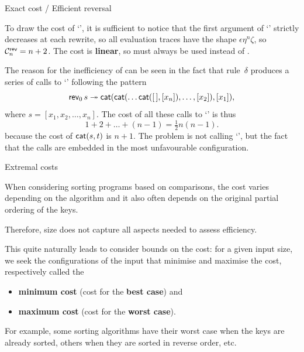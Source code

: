 %
\begin{frame}{Exact cost / Efficient reversal}

  To draw the cost of `', it is sufficient to notice that the
  first argument of `' strictly decreases at each rewrite,
  so all evaluation traces have the shape \(\epsilon\eta^n\zeta\), so
  \(\C{\fun{rev}}{n} = n + 2\). The cost is \textbf{linear}, so
   must always be used instead of .

  \bigskip

  The reason for the inefficiency of  can be seen in
  the fact that rule~\(\delta\) produces a series of calls to
  `' following the pattern
  \begin{equation*}
    \fun{rev}_0\,s \twoheadrightarrow \fun{cat}(\fun{cat}(\dots
    \fun{cat}(\el, [x_n]), \dots, [x_2]), [x_1]),
  \end{equation*}
  where \(s = [x_1, x_2, \dots, x_n]\). The cost of all these calls to
  `' is thus
  \begin{equation*}
    1 + 2 + \dots + (n-1) = \tfrac{1}{2}n(n-1).
  \end{equation*}
  because the cost of \(\fun{cat}(s,t)\) is \(n+1\). The problem is
  not calling `', but the fact that the calls are embedded in
  the most unfavourable configuration.

\end{frame}

%
\begin{frame}{Extremal costs}

  When considering sorting programs based on comparisons, the cost
  varies depending on the algorithm and it also often depends on the
  original partial ordering of the keys.

  \bigskip

  Therefore, size does not capture all aspects needed to assess
  efficiency.

  \bigskip

  This quite naturally leads to consider bounds on the cost: for a
  given input size, we seek the configurations of the input that
  minimise and maximise the cost, respectively called the
  \begin{itemize}

    \item \textbf{minimum cost} (cost for the \textbf{best case}) and

    \item \textbf{maximum cost} (cost for the \textbf{worst case}).

  \end{itemize}

  \bigskip

  For example, some sorting algorithms have their worst case when the
  keys are already sorted, others when they are sorted in reverse
  order, etc.

\end{frame}

